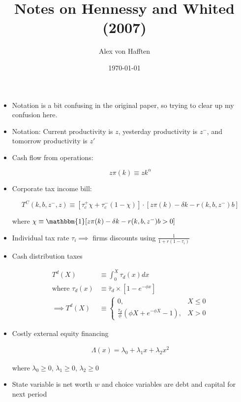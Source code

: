 \documentclass{article}
\title{Notes on Hennessy and Whited (2007)}
\author{Alex von Hafften}
\date{\today}
\newcommand{\one}{\mathbbm{1}}
\begin{document}
\maketitle

\begin{itemize}

\item Notation is a bit confusing in the original paper, so trying to clear up my confusion here.

\item Notation: Current productivity is $z$, yesterday productivity is $z^-$, and tomorrow productivity is $z'$

\item Cash flow from operations:

$$
z \pi(k) \equiv z k ^ \alpha
$$

\item Corporate tax income bill:

$$
T^C(k, b, z^-, z) \equiv [\tau_c^+ \chi + \tau_c^- ( 1 - \chi)] \cdot [z \pi (k) - \delta k - r(k, b, z^-) b]
$$

where  $\chi \equiv \one[z \pi (k) - \delta k - r(k, b, z^-) b > 0]$

\item Individual tax rate $\tau_i \implies$ firms discounts using $\frac{1}{1 + r(1-\tau_i)}$

\item Cash distribution taxes

\begin{align*}
T^d(X) &\equiv \int_0^X \tau_d(x) dx \\
\text{where } 
\tau_d(x) &\equiv \bar \tau_d \times [1 - e^{-\phi x}] \\
\implies
T^d(X) &\equiv 
\begin{cases}
0,& X \le 0\\
\frac{\bar \tau_d}{\phi}(\phi X + e^{-\phi X} - 1), & X > 0
\end{cases}
\end{align*}

\item Costly external equity financing

\begin{align*}
\Lambda(x) = \lambda_0 +\lambda_1 x + \lambda_2 x^2
\end{align*}

where $\lambda_0 \ge 0$, $\lambda_1 \ge 0$, $\lambda_2 \ge 0$

\item State variable is net worth $w$ and choice variables are debt and capital for next period


\end{itemize}
\end{document}
